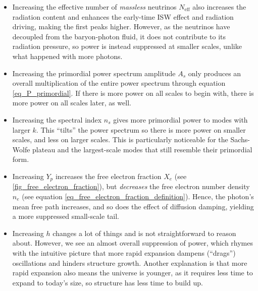 \documentclass[10pt,a4paper]{article}
\begin{document}
\begin{itemize}
\item
Increasing the effective number of \emph{massless} neutrinos $N_\text{eff}$
also increases the radiation content and enhances the early-time ISW effect and radiation driving,
making the first peaks higher.
However, as the neutrinos have decoupled from the baryon-photon fluid,
it does not contribute to its radiation pressure,
so power is instead suppressed at smaller scales, unlike what happened with more photons.



\item
Increasing the primordial power spectrum amplitude $A_s$
only produces an overall multiplication of the entire power spectrum through equation \eqref{eq_P_primordial}.
If there is more power on all scales to begin with,
there is more power on all scales later, as well.

\item
Increasing the spectral index $n_s$ gives more primordial power to modes with larger $k$.
This ``tilts'' the power spectrum so there is more power on smaller scales, and less on larger scales.
This is particularly noticeable for the Sachs-Wolfe plateau and the largest-scale modes that still resemble their primordial form.

\item
Increasing $Y_p$ increases the free electron fraction $X_e$ (see \cref{fig_free_electron_fraction}),
but \emph{decreases} the free electron number density $n_e$ (see equation \eqref{eq_free_electron_fraction_definition}).
Hence, the photon's mean free path increases,
and so does the effect of diffusion damping,
yielding a more suppressed small-scale tail.

\item
Increasing $h$ changes a lot of things and is not straightforward to reason about.
However, we see an almost overall suppression of power,
which rhymes with the intuitive picture that more rapid expansion dampens (``drags'') oscillations and hinders structure growth.
Another explanation is that more rapid expansion also means the universe is younger,
as it requires less time to expand to today's size,
so structure has less time to build up.


\end{itemize}
\end{document}

